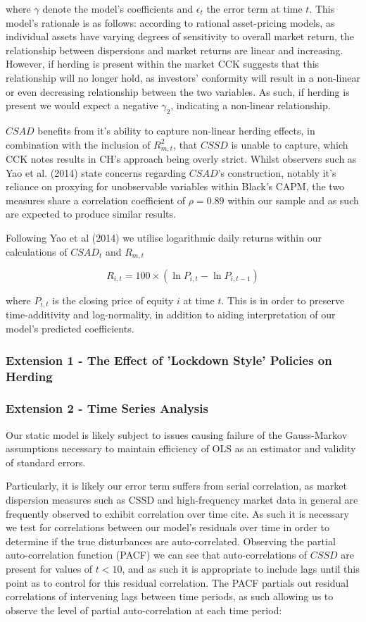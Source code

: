 \documentclass[12pt]{article}
\begin{document}
where $\gamma$ denote the model’s coefficients and $\epsilon_t$ the error term at time $t$. This model’s rationale is as follows: according to rational asset-pricing models, as individual assets have varying degrees of sensitivity to overall market return, the relationship between dispersions and market returns are linear and increasing. However, if herding is present within the market CCK suggests that this relationship will no longer hold, as investors’ conformity will result in a non-linear or even decreasing relationship between the two variables. As such, if herding is present we would expect a negative $\gamma_2$, indicating a non-linear relationship.

$CSAD$ benefits from it’s ability to capture non-linear herding effects, in combination with the inclusion of $R_{m,t}^2$, that $CSSD$ is unable to capture, which CCK notes results in CH’s approach being overly strict. Whilst observers such as Yao et al. (2014) state concerns regarding $CSAD$’s construction, notably it’s reliance on proxying for unobservable variables within Black’s CAPM, the two measures share a correlation coefficient of $\rho=0.89$ within our sample and as such are expected to produce similar results.

Following Yao et al (2014) we utilise logarithmic daily returns within our calculations of $CSAD_t$ and $R_{m,t}$

$$
R_{i,t}=100\times(\ln{P_{i,t}}-\ln{P_{i,t-1}})
$$

where $P_{i,t}$ is the closing price of equity $i$ at time $t$. This is in order to preserve time-additivity and log-normality, in addition to aiding interpretation of our model’s predicted coefficients.

\subsubsection*{Extension 1 - The Effect of 'Lockdown Style' Policies on Herding}

\subsubsection*{Extension 2 - Time Series Analysis}

Our static model is likely subject to issues causing failure of the Gauss-Markov assumptions necessary to maintain efficiency of OLS as an estimator and validity of standard errors. 

Particularly, it is likely our error term suffers from serial correlation, as market dispersion measures such as CSSD and high-frequency market data in general are frequently observed to exhibit correlation over time cite. As such it is necessary we test for correlations between our model’s residuals over time in order to determine if the true disturbances are auto-correlated. Observing the partial auto-correlation function (PACF) we can see that auto-correlations of $CSSD$ are present for values of $t<10$, and as such it is appropriate to include lags until this point as to control for this residual correlation. The PACF partials out residual correlations of intervening lags between time periods, as such allowing us to observe the level of partial auto-correlation at each time period:
\end{document}
